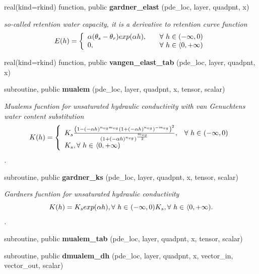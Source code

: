 \begin{DoxyCompactItemize}
real(kind=rkind) function, public {\bf gardner\+\_\+elast} (pde\+\_\+loc, layer, quadpnt, x)
\begin{DoxyCompactList}\small\item\em so-\/called retention water capacity, it is a derivative to retention curve function \[ E(h) = \left\{ \begin{array}{l l} \alpha (\theta_s - \theta_r) exp(\alpha h) , & \quad \mbox{$\forall$ $h \in (-\infty, 0 )$}\\ 0, & \quad \mbox{$\forall$ $h \in \langle 0, + \infty )$}\\ \end{array} \right. \] \end{DoxyCompactList}\item 
real(kind=rkind) function, public {\bf vangen\+\_\+elast\+\_\+tab} (pde\+\_\+loc, layer, quadpnt, x)
\item 
subroutine, public {\bf mualem} (pde\+\_\+loc, layer, quadpnt, x, tensor, scalar)
\begin{DoxyCompactList}\small\item\em Mualem\textquotesingle{}s fucntion for unsaturated hydraulic conductivity with van Genuchten\textquotesingle{}s water content substitution \[ K(h) = \left\{ \begin{array}{l l} K_s\frac{\left( 1- (-\alpha h)^{n_{vg}m_{vg}} \left( 1+ (-\alpha h)^{n_{vg}} \right)^{-m_{vg}} \right)^2}{\left(1+(-\alpha h)^{n_{vg}} \right)^{\frac{m_{vg}}{2}}}, & \mbox{$\forall$ $h \in$ $(-\infty,0)$}\\ K_s, \mbox{$\forall$ $h \in$ $\langle 0, +\infty)$}\\ \end{array} \right. \]. \end{DoxyCompactList}\item 
subroutine, public {\bf gardner\+\_\+ks} (pde\+\_\+loc, layer, quadpnt, x, tensor, scalar)
\begin{DoxyCompactList}\small\item\em Gardner\textquotesingle{}s fucntion for unsaturated hydraulic conductivity \[ K(h) = K_s exp(\alpha h), \mbox{$\forall$ $h \in$ $(-\infty,0)$}\\ K_s, \mbox{$\forall$ $h \in$ $\langle 0, +\infty)$}. \]. \end{DoxyCompactList}\item 
subroutine, public {\bf mualem\+\_\+tab} (pde\+\_\+loc, layer, quadpnt, x, tensor, scalar)
\item 
subroutine, public {\bf dmualem\+\_\+dh} (pde\+\_\+loc, layer, quadpnt, x, vector\+\_\+in, vector\+\_\+out, scalar)

\end{DoxyCompactItemize}
